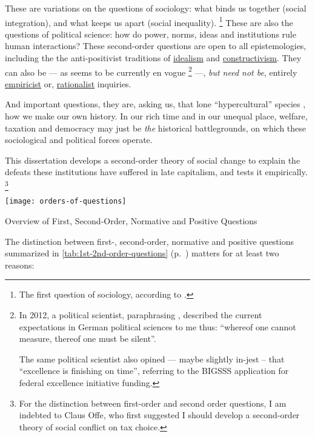These are variations on the questions of sociology:
what binds us together (social integration), and what keeps us apart (social inequality).
\footnote{
	The first question of sociology, according to \citet[66]{Dahrendorf1966}.
}
These are also the questions of political science:
how do power, norms, ideas and institutions rule human interactions?
These second-order questions are open to all epistemologies, including the the anti-positivist traditions of \hyperref[itm:idealism]{idealism} and \hyperref[itm:constructivism]{constructivism}.
They can also be --- as seems to be currently en vogue
\footnote{
	In 2012, a political scientist, paraphrasing \cite{Wittgenstein1998}, described the current expectations in German political sciences to me thus:
	``whereof one cannot measure, thereof one must be silent''.

	The same political scientist also opined --- maybe slightly in-jest -- that ``excellence is finishing on time'', referring to the \gls{BIGSSS} application for federal excellence initiative funding.
}
---, \emph{but need not be}, entirely  \hyperref[itm:empiricism]{empiricist} or, \hyperref[itm:rationalism]{rationalist} inquiries.

And important questions, they are, asking us, that lone ``hypercultural'' species \citep{Henrich2004}, how we make our own history.
In our rich time and in our unequal place, welfare, taxation and democracy may just be \emph{the} historical battlegrounds, on which these sociological and political forces operate.

This dissertation develops a second-order theory of social change to explain the defeats these institutions have suffered in late capitalism, and tests it empirically.
\footnote{
	For the distinction between first-order and second order questions, I am indebted to Claus Offe, who first suggested I should develop a second-order theory of social conflict on tax choice.
}

\begin{table}[htbp]
	\centering
	\texttt{[image: orders-of-questions]}
	\caption{Overview of First, Second-Order, Normative and Positive Questions}
	\label{tab:1st-2nd-order-questions}
\end{table}

The distinction between first-, second-order, normative and positive questions summarized in \autoref{tab:1st-2nd-order-questions} (p.~\pageref{tab:1st-2nd-order-questions}) matters for at least two reasons:

